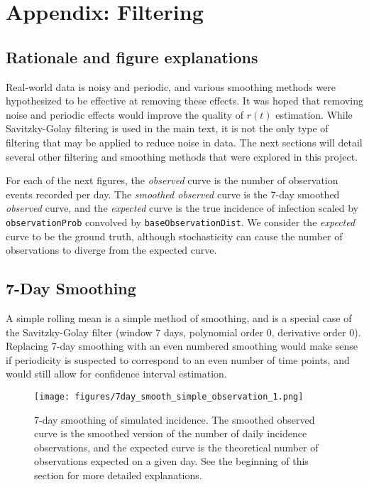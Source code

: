 \documentclass{article}
\newcommand{\code}[1]{\texttt{#1}}
\begin{document}
\section{Appendix: Filtering}
\subsection{Rationale and figure explanations}
Real-world data is noisy and periodic, and various smoothing methods were hypothesized to be effective at removing these effects. It was hoped that removing noise and periodic effects would improve the quality of $r(t)$ estimation. While Savitzky-Golay filtering is used in the main text, it is not the only type of filtering that may be applied to reduce noise in data. The next sections will detail several other filtering and smoothing methods that were explored in this project.

For each of the next figures, the \emph{observed} curve is the number of observation events recorded per day. The \emph {smoothed observed} curve is the 7-day smoothed \emph{observed} curve, and the \emph{expected} curve is the true incidence of infection scaled by \code{observationProb} convolved by \code{baseObservationDist}. We consider the \emph{expected} curve to be the ground truth, although stochasticity can cause the number of observations to diverge from the expected curve.


\subsection{7-Day Smoothing}
A simple rolling mean is a simple method of smoothing, and is a special case of the Savitzky-Golay filter (window 7 days, polynomial order 0, derivative order 0). Replacing 7-day smoothing with an even numbered smoothing would make sense if periodicity is suspected to correspond to an even number of time points, and would still allow for confidence interval estimation.

\clearpage
\begin{figure}[h!]
    \centering
    \texttt{[image: figures/7day\_smooth\_simple\_observation\_1.png]}
    \caption{7-day smoothing of simulated incidence. The smoothed observed curve is the smoothed version of the number of daily incidence observations, and the expected curve is the theoretical number of observations expected on a given day. See the beginning of this section for more detailed explanations.} 

\end{figure}
\end{document}
